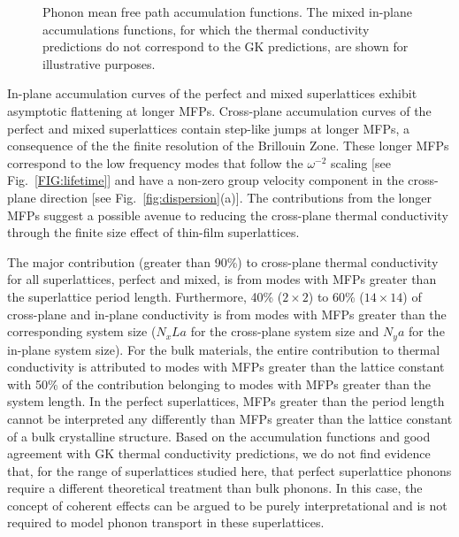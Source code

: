 \documentclass[aps,prb,preprint,preprintnumbers,amsmath,amssymb,floatfix,superscriptaddress]{revtex4}
\begin{document}
\begin{figure}%
\begin{center}
\renewcommand{\figure}{Fig.}
\caption{Phonon mean free path accumulation functions. The mixed in-plane accumulations functions, for which the thermal conductivity predictions do not correspond to the GK predictions, are shown for illustrative purposes.}
\label{FIG:MFP_cuml}
\end{center}
\end{figure}
In-plane accumulation curves of the perfect and mixed superlattices exhibit asymptotic flattening at longer MFPs. Cross-plane accumulation curves of the perfect and mixed superlattices contain step-like jumps at longer MFPs, a consequence of the the finite resolution of the Brillouin Zone.\cite{esfarjani2011heat} These longer MFPs correspond to the low frequency modes that follow the $\omega^{-2}$ scaling [see Fig.~\ref{FIG:lifetime}] and have a non-zero group velocity component in the cross-plane direction [see Fig.~\ref{fig:dispersion}(a)]. The contributions from the longer MFPs suggest a possible avenue to reducing the cross-plane thermal conductivity through the finite size effect of thin-film superlattices.\cite{Luckyanova16112012} 

The major contribution (greater than 90\%) to cross-plane thermal conductivity for all superlattices, perfect and mixed, is from modes with MFPs greater than the superlattice period length. Furthermore, 40\% ($2 \times 2 $) to 60\% ($14 \times 14$) of cross-plane and in-plane conductivity is from modes with MFPs greater than the corresponding system size ($N_xLa$ for the cross-plane system size and $N_ya$ for the in-plane system size). For the bulk materials, the entire contribution to thermal conductivity is attributed to modes with MFPs greater than the lattice constant with 50\% of the contribution belonging to modes with MFPs greater than the system length. In the perfect superlattices, MFPs greater than the period length cannot be interpreted any differently than MFPs greater than the lattice constant of a bulk crystalline structure. Based on the accumulation functions and good agreement with GK thermal conductivity predictions, we do not find evidence that, for the range of superlattices studied here, that perfect superlattice phonons require a different theoretical treatment than bulk phonons. In this case, the concept of coherent effects can be argued to be purely interpretational and is not required to model phonon transport in these superlattices. 
\end{document}
